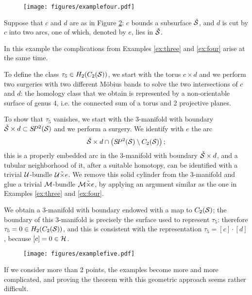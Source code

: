 \begin{figure}[h]\centering
 \texttt{[image: figures/examplefour.pdf]}
 \caption{}
\label{fig:examplefour}
\end{figure}

\begin{ex}
 \label{ex:five}
 Suppose that $c$ and $d$ are as in Figure \ref{fig:examplefive}:
 $c$ bounds a subsurface $\check{\S}$, and $d$ is cut by $c$ into two arcs, one of which, denoted by $e$, lies
 in $\check{\S}$.
 
 In this example the complications from Examples \ref{ex:three} and \ref{ex:four} arise at the same time.
 
 To define the class $\tau_5\in H_2(C_2(\S))$, we start with the torus $c\times d$ and we perform two surgeries
 with two different M\"{o}bius bands to solve the two intersections of $c$ and $d$: the homology
 class that we obtain is represented by a non-orientable surface of genus 4, i.e. the connected
 sum of a torus and 2 projective planes.
 
 To show that $\tau_5$ vanishes, we start with the 3-manifold with boundary $\check{\S}\times d\subset\SP^2(\S)$ and we perform
 a surgery. We identify with $e$ the arc
 \[
  \check{\S}\times d\cap\pa{\SP^2(\S)\setminus C_2(\S)};
 \]
 this is a properly embedded arc in the 3-manifold with boundary $\check{\S}\times d$, and a tubular neighborhood
 of it, after a suitable homotopy, can be identified with a trivial $\U$-bundle $\U\tilde{\times} e$. We remove
 this solid cylinder from the 3-manifold and glue a trivial $\M$-bundle $\M\tilde{\times} e$, by applying an argument
 similar as the one in Examples \ref{ex:three} and \ref{ex:four}.
 
 We obtain a 3-manifold with boundary endowed with a map to $C_2(\S)$; the boundary of this 3-manifold
 is precisely the surface used to represent $\tau_5$: therefore $\tau_5=0\in H_2(C_2(\S))$,
 and this is consistent with the representation $\tau_5=[c]\cdot[d]$, because $[c]=0\in \H$.
\end{ex}

\begin{figure}[h]\centering
 \texttt{[image: figures/examplefive.pdf]}
 \caption{}
\label{fig:examplefive}
\end{figure}

If we consider more than 2 points, the examples become more and more complicated, and proving the theorem with this geometric
approach seems rather difficult.